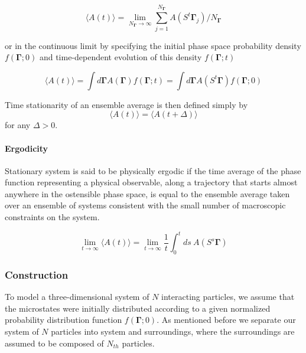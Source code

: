 \documentclass[a4paper,12pt,nofootinbib]{article}
\begin{document}
\begin{equation}
  \langle A(t) \rangle = \lim_{N_{\bm{\Gamma}}
 \to \infty} \sum_{j=1}^{N_{\bm{\Gamma}}} A(S^t \bm{\Gamma}_j)/N_{\bm{\Gamma}}
\end{equation}

or in the continuous limit by specifying the initial phase space probability density $f(\bm{\Gamma};0)$ and time-dependent evolution of this density $f(\bm{\Gamma};t)$

\begin{equation}
  \langle A(t) \rangle = \int d\bm{\Gamma} A(\bm{\Gamma}) f(\bm{\Gamma};t) = \int d\bm{\Gamma} A(S^t\bm{\Gamma})f(\bm{\Gamma};0)
\end{equation}

Time stationarity of an ensemble average is then defined simply by
\begin{equation}
    \langle A(t) \rangle =   \langle A(t+\Delta) \rangle
\end{equation}
for any $\Delta > 0$.


\paragraph{Ergodicity}
Stationary system is said to be physically ergodic if the time average of the phase function representing a physical observable, along a trajectory that starts almost anywhere in the ostensible phase space, is equal to the ensemble average taken over an ensemble of systems consistent with the small number of macroscopic constraints on the system.


\begin{equation}
    \lim_{t \to \infty} \langle A(t) \rangle = \lim_{t \to \infty} \frac{1}{t} \int_0^t ds\ A(S^s \bm{\Gamma})
\end{equation}

\subsubsection{Construction}

To model a three-dimensional system of $N$ interacting particles, we assume that the microstates were initially distributed according to a given normalized probability distribution function $f(\bm{\Gamma};0)$. As mentioned before we separate our system of $N$ particles into system and surroundings, where the surroundings are assumed to be composed of $N_{th}$ particles. 
\end{document}
